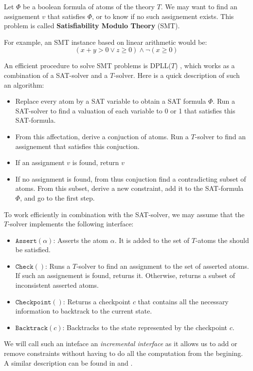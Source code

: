 \documentclass{article}
\newcommand{\iassert}[1]{\mathtt{Assert}(#1)}
\newcommand{\icheck}{\mathtt{Check}()}
\newcommand{\icheckpoint}{\mathtt{Checkpoint}()}
\newcommand{\ibacktrack}[1]{\mathtt{Backtrack}(#1)}
\begin{document}
Let $\Phi$ be a boolean formula of atoms of the theory $T$. We may want to find
an assignement $v$ that satisfies $\Phi$, or to know if no such assignement
exists. This problem is called \textbf{Satisfiability Modulo Theory} (SMT).

For example, an SMT instance based on linear arithmetic would be:
$$(x + y > 0 \vee z \geqslant 0) \wedge \neg (x \geqslant 0)$$

An efficient procedure to solve SMT problems is DPLL($T$)
\cite[Section 3.2]{Decision2016},
which works as a combination of a SAT-solver and a $T$-solver. Here is a quick
description of such an algorithm:
\begin{itemize}
  \item Replace every atom by a SAT variable to obtain a SAT formula $\Phi$.
    Run a SAT-solver to find a valuation of each variable to 0 or 1 that
    satisfies this SAT-formula.
  \item From this affectation, derive a conjuction of atoms. Run a
    $T$-solver to find an assignement that satisfies this conjuction.
  \item If an assignment $v$ is found, return $v$
  \item If no assignment is found, from thus conjuction find a contradicting
    subset of atoms. From this subset, derive a new constraint, add it to the
    SAT-formula $\Phi$, and go to the first step.
\end{itemize}

To work efficiently in combination with the SAT-solver, we may assume that the
$T$-solver implements the following interface:
\begin{itemize}
  \item $\iassert{\alpha}$: Asserts the atom $\alpha$. It is added to the set of
    $T$-atoms the should be satisfied.
  \item $\icheck$: Runs a $T$-solver to find an assignment to the set of
    asserted atoms. If such an assignement is found, returns it. Otherwise,
    returns a subset of inconsistent asserted atoms.
  \item $\icheckpoint$: Returns a checkpoint $c$ that contains all the necessary
    information to backtrack to the current state.
  \item $\ibacktrack{c}$: Backtracks to the state represented by the checkpoint
    $c$.
\end{itemize}

We will call such an inteface an \textit{incremental interface} as it allows us
to add or remove constraints without having to do all the computation from the
begining. A similar description can be found in \cite{Dutertre2006} and
\cite{Thiemann2018,BHT2019}.
\end{document}
